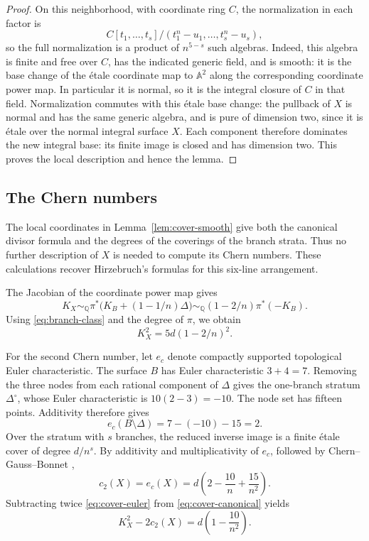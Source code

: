 \begin{proof}
On this neighborhood, with coordinate ring $C$, the normalization in
each factor is
\[
 C[t_1,\ldots,t_s]/(t_1^n-u_1,\ldots,t_s^n-u_s),
\]
so the full normalization is a product of $n^{5-s}$ such algebras.
Indeed, this algebra is finite and free over $C$, has the indicated
generic field, and is smooth: it is the base change of the \'{e}tale
coordinate map to $\mathbb A^2$ along the corresponding coordinate
power map.  In particular it is normal, so it is the integral closure
of $C$ in that field.  Normalization commutes with this \'{e}tale base
change: the pullback of $X$ is normal and has the same generic algebra,
and is pure of dimension two, since it is \'{e}tale over the normal
integral surface $X$. Each component therefore dominates the new
integral base: its finite image is closed and has dimension two.
This proves the local description
and hence the lemma.
\end{proof}

\subsection{The Chern numbers}

The local coordinates in Lemma~\ref{lem:cover-smooth} give both the
canonical divisor formula and the degrees of the coverings of the
branch strata.  Thus no further description of $X$ is needed to compute
its Chern numbers. These calculations recover Hirzebruch's formulas
\cite[Section~2.2, Equations~(5) and (7)]{Hirzebruch1983} for this
six-line arrangement.

The Jacobian of the coordinate power map gives
\[
 K_X\sim_{\mathbb Q}
 \pi^*\bigl(K_B+(1-1/n)\Delta\bigr)
 \sim_{\mathbb Q}(1-2/n)\pi^*(-K_B).
\]
Using \eqref{eq:branch-class} and the degree of $\pi$, we obtain
\begin{equation}\label{eq:cover-canonical}
 K_X^2=5d(1-2/n)^2.
\end{equation}

For the second Chern number, let $e_c$ denote compactly supported
topological Euler characteristic.  The surface $B$ has Euler
characteristic $3+4=7$.  Removing the three nodes from each rational
component of $\Delta$ gives the one-branch stratum $\Delta^\circ$,
whose Euler characteristic is $10(2-3)=-10$.  The node set has fifteen
points.  Additivity therefore gives
\[
 e_c(B\setminus\Delta)=7-(-10)-15=2.
\]
Over the stratum with $s$ branches, the reduced inverse image is a
finite \'{e}tale cover of degree $d/n^s$.  By additivity and
multiplicativity of $e_c$, followed by Chern--Gauss--Bonnet
\cite[Section~1.3 and Proposition~1.6]{Behrend2009},
\begin{equation}\label{eq:cover-euler}
 c_2(X)=e_c(X)
 =d\left(2-\frac{10}{n}+\frac{15}{n^2}\right).
\end{equation}
Subtracting twice \eqref{eq:cover-euler} from
\eqref{eq:cover-canonical} yields
\begin{equation}\label{eq:cover-chern-gap}
 K_X^2-2c_2(X)=d\left(1-\frac{10}{n^2}\right).
\end{equation}

